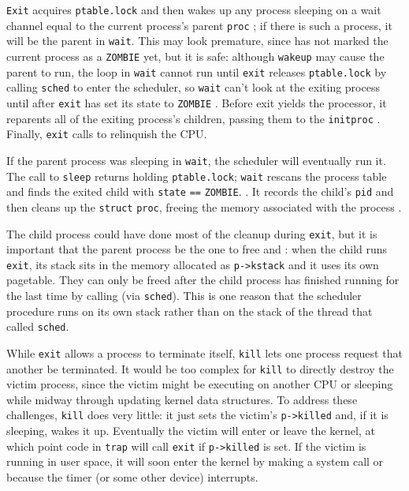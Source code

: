 \lstinline{Exit}
acquires
\lstinline{ptable.lock}
and then wakes up any process sleeping on a wait
channel equal to the current process's parent
\lstinline{proc}
;
if there is such a process, it will be the parent in
\lstinline{wait}.
This may look premature, since 
has not marked the current process as a
\lstinline{ZOMBIE}
yet, but it is safe:
although
\lstinline{wakeup}
may cause the parent to run,
the loop in
\lstinline{wait}
cannot run until
\lstinline{exit}
releases 
\lstinline{ptable.lock}
by calling
\lstinline{sched}
to enter the scheduler,
so
\lstinline{wait}
can't look at
the exiting process until after
\lstinline{exit}
has set its state to
\lstinline{ZOMBIE}
.
Before exit yields the processor,
it reparents all of
the exiting process's children,
passing them to the
\lstinline{initproc}
.
Finally,
\lstinline{exit}
calls
to relinquish the CPU.

If the parent process was sleeping in
\lstinline{wait},
the scheduler will eventually run it.
The call to
\lstinline{sleep}
returns holding
\lstinline{ptable.lock};
\lstinline{wait}
rescans the process table
and finds the exited child with
\lstinline{state}
\lstinline{==}
\lstinline{ZOMBIE}.
.
It records the child's
\lstinline{pid}
and then cleans up the 
\lstinline{struct} 
\lstinline{proc},
freeing the memory associated
with the process
.

The child process could have done most
of the cleanup during
\lstinline{exit},
but it is important that the parent 
process be the one to free
and 
:
when the child runs
\lstinline{exit},
its stack sits in the memory allocated as
\lstinline{p->kstack} 
and it uses its own pagetable.
They can only be freed after the child process has
finished running for the last time by calling
(via
\lstinline{sched}).
This is one reason that the scheduler procedure runs on its
own stack rather than on the stack of the thread
that called
\lstinline{sched}.

While
\lstinline{exit} 
allows a process to terminate itself,
\lstinline{kill}
lets one process request that another be terminated.
It would be too complex for
\lstinline{kill}
to directly destroy the victim process, since the victim
might be executing on another CPU or sleeping
while midway through updating kernel data structures.
To address these challenges, 
\lstinline{kill}
does very little: it just sets the victim's
\lstinline{p->killed}
and, if it is sleeping, wakes it up.
Eventually the victim will enter or leave the kernel,
at which point code in
\lstinline{trap}
will call
\lstinline{exit}
if
\lstinline{p->killed}
is set.
If the victim is running in user space, it will soon enter
the kernel by making a system call or because the timer (or
some other device) interrupts.

